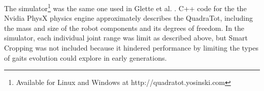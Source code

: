 The simulator\footnote{Available for Linux and Windows at http://quadratot.yosinski.com} was the same one used in Glette et al. \cite{glette}. C++ code for the the Nvidia PhysX physics engine approximately describes the QuadraTot, including the mass and size of the robot components and its degrees of freedom. In the simulator, each individual joint range was limit as described above, but Smart Cropping was not included because it hindered performance by limiting the types of gaits evolution could explore in early generations. 


